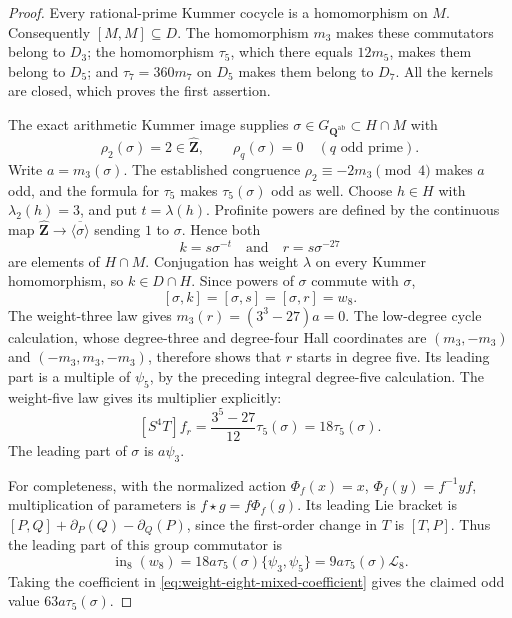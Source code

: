 \begin{proof}
Every rational-prime Kummer cocycle is a homomorphism on $M$.
Consequently $[M,M]\subseteq D$. The homomorphism $m_3$ makes
these commutators belong to $D_3$; the homomorphism $\tau_5$, which
there equals $12m_5$, makes them belong to $D_5$; and $\tau_7=360m_7$
on $D_5$ makes them belong to $D_7$. All the kernels are closed,
which proves the first assertion.

The exact arithmetic Kummer image supplies
$\sigma\in G_{\mathbf Q^{\mathrm{ab}}}\subset H\cap M$ with
\[
 \rho_2(\sigma)=2\in\widehat{\mathbf Z},\qquad
 \rho_q(\sigma)=0\quad(q\text{ odd prime}).
\]
Write $a=m_3(\sigma)$. The established congruence
$\rho_2\equiv-2m_3\pmod4$ makes $a$ odd, and the formula for
$\tau_5$ makes $\tau_5(\sigma)$ odd as well.
Choose $h\in H$ with $\lambda_2(h)=3$, and put $t=\lambda(h)$.
Profinite powers are defined by the continuous map
$\widehat{\mathbf Z}\to\overline{\langle\sigma\rangle}$ sending
$1$ to $\sigma$. Hence both
\[
 k=s\sigma^{-t}\quad\text{and}\quad r=s\sigma^{-27}
\]
are elements of $H\cap M$. Conjugation has weight $\lambda$
on every Kummer homomorphism, so $k\in D\cap H$. Since powers of
$\sigma$ commute with $\sigma$,
\[
 [\sigma,k]=[\sigma,s]=[\sigma,r]=w_8.
\]
The weight-three law gives $m_3(r)=(3^3-27)a=0$. The low-degree
cycle calculation, whose degree-three and degree-four Hall
coordinates are $(m_3,-m_3)$ and $(-m_3,m_3,-m_3)$, therefore shows
that $r$ starts in degree five. Its leading part is a multiple of
$\psi_5$, by the preceding integral degree-five calculation. The
weight-five law gives its multiplier explicitly:
\[
 [S^4T]f_r=\frac{3^5-27}{12}\tau_5(\sigma)
       =18\tau_5(\sigma).
\]
The leading part of $\sigma$ is $a\psi_3$.

For completeness, with the normalized action
$\Phi_f(x)=x$, $\Phi_f(y)=f^{-1}yf$, multiplication of parameters
is $f\star g=f\Phi_f(g)$. Its leading Lie bracket is
$[P,Q]+\partial_P(Q)-\partial_Q(P)$, since the first-order change
in $T$ is $[T,P]$. Thus the leading part of this group
commutator is
\[
 \operatorname{in}_8(w_8)
   =18a\tau_5(\sigma)\{\psi_3,\psi_5\}
   =9a\tau_5(\sigma)\mathcal L_8.
\]
Taking the coefficient in
\eqref{eq:weight-eight-mixed-coefficient} gives the claimed odd
value $63a\tau_5(\sigma)$.
\end{proof}

